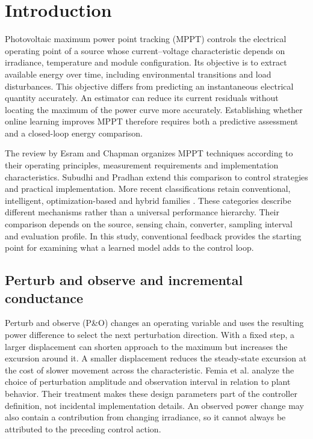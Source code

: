 \section{Introduction}
Photovoltaic maximum power point tracking (MPPT) controls the electrical operating point of a source whose current--voltage characteristic depends on irradiance, temperature and module configuration. Its objective is to extract available energy over time, including environmental transitions and load disturbances. This objective differs from predicting an instantaneous electrical quantity accurately. An estimator can reduce its current residuals without locating the maximum of the power curve more accurately. Establishing whether online learning improves MPPT therefore requires both a predictive assessment and a closed-loop energy comparison.

The review by Esram and Chapman \cite{esram} organizes MPPT techniques according to their operating principles, measurement requirements and implementation characteristics. Subudhi and Pradhan \cite{subudhi} extend this comparison to control strategies and practical implementation. More recent classifications retain conventional, intelligent, optimization-based and hybrid families \cite{review2023}. These categories describe different mechanisms rather than a universal performance hierarchy. Their comparison depends on the source, sensing chain, converter, sampling interval and evaluation profile. In this study, conventional feedback provides the starting point for examining what a learned model adds to the control loop.

\subsection{Perturb and observe and incremental conductance}
Perturb and observe (P\&O) changes an operating variable and uses the resulting power difference to select the next perturbation direction. With a fixed step, a larger displacement can shorten approach to the maximum but increases the excursion around it. A smaller displacement reduces the steady-state excursion at the cost of slower movement across the characteristic. Femia et al. \cite{femia} analyze the choice of perturbation amplitude and observation interval in relation to plant behavior. Their treatment makes these design parameters part of the controller definition, not incidental implementation details. An observed power change may also contain a contribution from changing irradiance, so it cannot always be attributed to the preceding control action.

